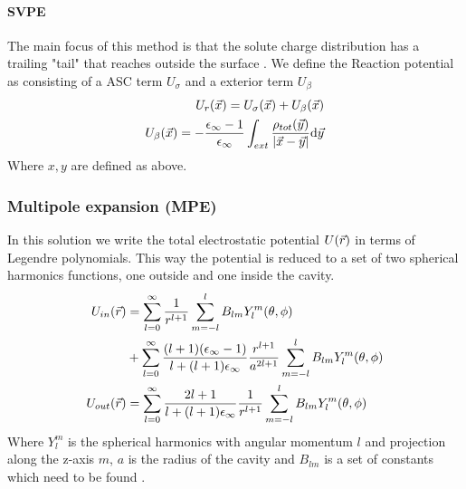 \documentclass[../master_thesis.tex]{subfiles}
\begin{document}
\paragraph{\ac{SVPE}}
The main focus of this method is that the solute charge distribution has a trailing
"tail" that reaches outside the surface \cite{Tomasi:2005ipa}. We define the
Reaction potential as consisting of a \ac{ASC} term $U_{\sigma}$ and a exterior
term $U_{\beta}$
\begin{align}
  \begin{split}
    U_r(\vec{x}) = U_{\sigma}(\vec{x}) + U_{\beta}(\vec{x})\\
    U_{\beta}(\vec{x}) = -\frac{\epsilon_{\infty} - 1}{\epsilon_{\infty}}\int_{ext} \frac{\rho_{tot}(\vec{y})}{\abs{\vec{x} - \vec{y}}} \text{d}\vec{y}
  \end{split}
\end{align}
Where $x, y$ are defined as above.

\subsubsection{Multipole expansion (MPE)}
In this solution we write the total electrostatic potential $U(\vec{r})$ in terms
of Legendre polynomials. This way the potential is reduced to a set of two
spherical harmonics functions, one outside and one inside the cavity.
\begin{align}
  \begin{split}
    U_{in}(\vec{r}) &= \sum_{l=0}^{\infty}\frac{1}{r^{l+1}}\sum^l_{m=-l}B_{lm}Y^m_l(\theta, \phi) \\
    &+ \sum_{l=0}^{\infty}\frac{(l+1)(\epsilon_{\infty} - 1)}{l + (l+1)\epsilon_{\infty}} \frac{r^{l+1}}{a^{2l+1}}\sum^l_{m=-l}B_{lm}Y^m_l(\theta, \phi)\\
    U_{out}(\vec{r}) &=\sum_{l=0}^{\infty}\frac{2l+1}{l+(l+1)\epsilon_{\infty}}\frac{1}{r^{l+1}}\sum^l_{m=-l}B_{lm}Y^m_l(\theta, \phi)
  \end{split}
\end{align}
Where $Y^m_l$ is the spherical harmonics with angular momentum $l$ and projection
along the z-axis $m$, $a$ is the radius of the cavity and $B_{lm}$ is a set of
constants which need to be found \cite{Tomasi:1994wt}.
\end{document}
